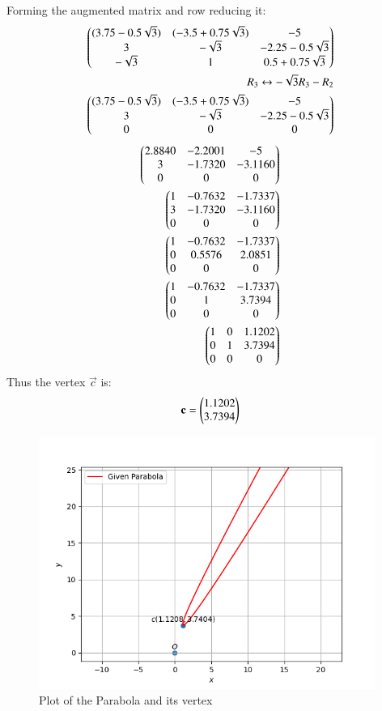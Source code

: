 \documentclass[journal,12pt,twocolumn]{IEEEtran}
\begin{document}
Forming the augmented matrix and row reducing it:
\begin{align}
\begin{pmatrix}(3.75-0.5\sqrt{3}) & (-3.5+0.75\sqrt{3}) & -5\\3 & -\sqrt{3} & -2.25-0.5\sqrt{3} \\-\sqrt{3} & 1 &0.5+0.75\sqrt{3} \end{pmatrix}\\
R_3\leftrightarrow -\sqrt{3}R_3 -R_2 \nonumber \\
\begin{pmatrix}(3.75-0.5\sqrt{3}) & (-3.5+0.75\sqrt{3}) & -5\\3 & -\sqrt{3} & -2.25-0.5\sqrt{3} \\0 & 0 &0\end{pmatrix}
\end{align}
\begin{align}
    \begin{pmatrix}2.8840 & -2.2001 & -5\\3 & -1.7320 & -3.1160 \\0 & 0 &0\end{pmatrix}\\
\begin{pmatrix}1 & -0.7632 & -1.7337\\3 & -1.7320 & -3.1160 \\0 & 0 &0\end{pmatrix}\\
\begin{pmatrix}1 & -0.7632 & -1.7337\\0 & 0.5576 & 2.0851 \\0 & 0 &0\end{pmatrix}\\
\begin{pmatrix}1 & -0.7632 & -1.7337\\0 & 1 & 3.7394 \\0 & 0 &0\end{pmatrix}\\
\begin{pmatrix}1 & 0 & 1.1202\\0 & 1 & 3.7394 \\0 & 0 &0\end{pmatrix}
\end{align}
Thus the vertex $\vec{c}$ is:
\begin{align}
\mathbf{c}=\begin{pmatrix} 1.1202\\3.7394\end{pmatrix} 
\end{align}
\begin{figure}[h!]
    \centering
    \includegraphics[width=11cm]{Figure_1.png}
    \caption{Plot of the Parabola and its vertex}
    \label{Plot of the Asymtotes}
\end{figure}
\end{document}
